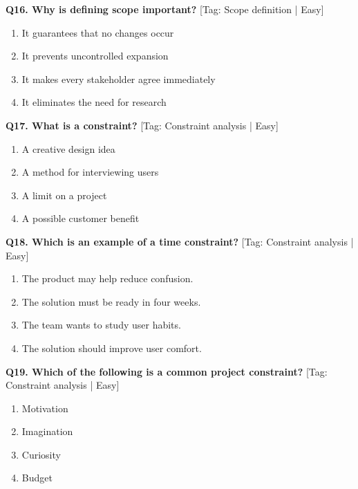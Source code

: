 \noindent\textbf{Q16. Why is defining scope important?} \hfill [Tag: Scope definition | Easy]
\begin{enumerate}[label=(\alph*),topsep=2pt,itemsep=1pt,partopsep=0pt,parsep=0pt]
    \item {It guarantees that no changes occur}
    \item {It prevents uncontrolled expansion}
    \item {It makes every stakeholder agree immediately}
    \item {It eliminates the need for research}
\end{enumerate}
\vspace{2mm}

\noindent\textbf{Q17. What is a constraint?} \hfill [Tag: Constraint analysis | Easy]
\begin{enumerate}[label=(\alph*),topsep=2pt,itemsep=1pt,partopsep=0pt,parsep=0pt]
    \item {A creative design idea}
    \item {A method for interviewing users}
    \item {A limit on a project}
    \item {A possible customer benefit}
\end{enumerate}
\vspace{2mm}

\noindent\textbf{Q18. Which is an example of a time constraint?} \hfill [Tag: Constraint analysis | Easy]
\begin{enumerate}[label=(\alph*),topsep=2pt,itemsep=1pt,partopsep=0pt,parsep=0pt]
    \item {The product may help reduce confusion.}
    \item {The solution must be ready in four weeks.}
    \item {The team wants to study user habits.}
    \item {The solution should improve user comfort.}
\end{enumerate}
\vspace{2mm}

\noindent\textbf{Q19. Which of the following is a common project constraint?} \hfill [Tag: Constraint analysis | Easy]
\begin{enumerate}[label=(\alph*),topsep=2pt,itemsep=1pt,partopsep=0pt,parsep=0pt]
    \item {Motivation}
    \item {Imagination}
    \item {Curiosity}
    \item {Budget}
\end{enumerate}
\vspace{2mm}

